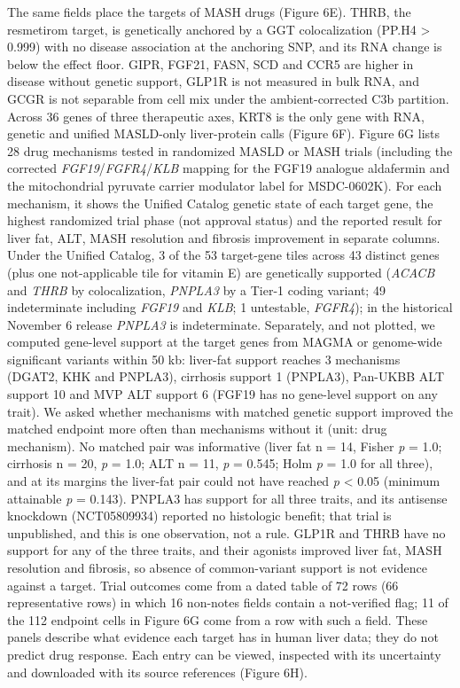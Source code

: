 The same fields place the targets of MASH drugs (Figure 6E). THRB, the resmetirom target, is genetically anchored by a GGT colocalization (PP.H4 \textgreater{} 0.999) with no disease association at the anchoring SNP, and its RNA change is below the effect floor. GIPR, FGF21, FASN, SCD and CCR5 are higher in disease without genetic support, GLP1R is not measured in bulk RNA, and GCGR is not separable from cell mix under the ambient-corrected C3b partition. Across 36 genes of three therapeutic axes, KRT8 is the only gene with RNA, genetic and unified MASLD-only liver-protein calls (Figure 6F). Figure 6G lists 28 drug mechanisms tested in randomized MASLD or MASH trials (including the corrected \emph{FGF19}/\emph{FGFR4}/\emph{KLB} mapping for the FGF19 analogue aldafermin and the mitochondrial pyruvate carrier modulator label for MSDC-0602K). For each mechanism, it shows the Unified Catalog genetic state of each target gene, the highest randomized trial phase (not approval status) and the reported result for liver fat, ALT, MASH resolution and fibrosis improvement in separate columns. Under the Unified Catalog, 3 of the 53 target-gene tiles across 43 distinct genes (plus one not-applicable tile for vitamin E) are genetically supported (\emph{ACACB} and \emph{THRB} by colocalization, \emph{PNPLA3} by a Tier-1 coding variant; 49 indeterminate including \emph{FGF19} and \emph{KLB}; 1 untestable, \emph{FGFR4}); in the historical November 6 release \emph{PNPLA3} is indeterminate. Separately, and not plotted, we computed gene-level support at the target genes from MAGMA or genome-wide significant variants within 50 kb: liver-fat support reaches 3 mechanisms (DGAT2, KHK and PNPLA3), cirrhosis support 1 (PNPLA3), Pan-UKBB ALT support 10 and MVP ALT support 6 (FGF19 has no gene-level support on any trait). We asked whether mechanisms with matched genetic support improved the matched endpoint more often than mechanisms without it (unit: drug mechanism). No matched pair was informative (liver fat n = 14, Fisher \emph{p} = 1.0; cirrhosis n = 20, \emph{p} = 1.0; ALT n = 11, \emph{p} = 0.545; Holm \emph{p} = 1.0 for all three), and at its margins the liver-fat pair could not have reached \emph{p} \textless{} 0.05 (minimum attainable \emph{p} = 0.143). PNPLA3 has support for all three traits, and its antisense knockdown (NCT05809934) reported no histologic benefit; that trial is unpublished, and this is one observation, not a rule. GLP1R and THRB have no support for any of the three traits, and their agonists improved liver fat, MASH resolution and fibrosis, so absence of common-variant support is not evidence against a target. Trial outcomes come from a dated table of 72 rows (66 representative rows) in which 16 non-notes fields contain a not-verified flag; 11 of the 112 endpoint cells in Figure 6G come from a row with such a field. These panels describe what evidence each target has in human liver data; they do not predict drug response. Each entry can be viewed, inspected with its uncertainty and downloaded with its source references (Figure 6H).

